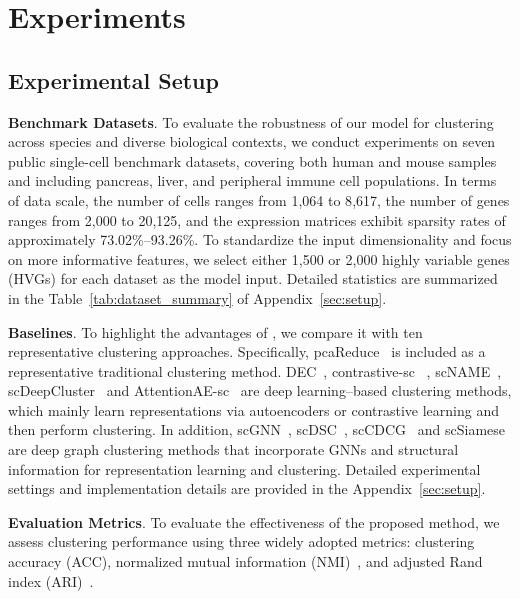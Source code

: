 \section{Experiments}
\label{sec::experiment}



\subsection{Experimental Setup}


\smallskip\noindent\textbf{Benchmark Datasets}. To evaluate the robustness of our model for clustering across species and diverse biological contexts, we conduct experiments on seven public single-cell benchmark datasets, covering both human and mouse samples and including pancreas, liver, and peripheral immune cell populations. 
In terms of data scale, the number of cells ranges from 1{,}064 to 8{,}617, the number of genes ranges from 2{,}000 to 20{,}125, and the expression matrices exhibit sparsity rates of approximately 73.02\%--93.26\%. To standardize the input dimensionality and focus on more informative features, we select either 1{,}500 or 2{,}000 highly variable genes (HVGs) for each dataset as the model input. Detailed statistics are summarized in the Table~\ref{tab:dataset_summary} of Appendix~\ref{sec:setup}.

\smallskip\noindent\textbf{Baselines}. To highlight the advantages of \method{}, we compare it with ten representative clustering approaches. Specifically, pcaReduce~\cite{vzurauskiene2016pcareduce} is included as a representative traditional clustering method. DEC~\cite{xie-et-al:dec}, contrastive-sc ~\cite{ciortan2021contrastive}, scNAME~\cite{wan-et-al:scname}, scDeepCluster~\cite{tian-et-al:model-based-scrnaseq} and AttentionAE-sc~\cite{li-et-al:attention-scrnaseq} are deep learning--based clustering methods, which mainly learn representations via autoencoders or contrastive learning and then perform clustering. In addition, scGNN~\cite{wang2021scgnn}, scDSC~\cite{gan2022deep},  scCDCG~\cite{xu2024sccdcg} and scSiamese~\cite{xu2025scsiameseclu} are deep graph clustering methods that incorporate GNNs and structural information for representation learning and clustering. Detailed experimental settings and implementation details are provided in the Appendix~\ref{sec:setup}.

\smallskip\noindent\textbf{Evaluation Metrics}. To evaluate the effectiveness of the proposed method, we assess clustering performance using three widely adopted metrics: clustering accuracy (ACC), normalized mutual information (NMI)~\cite{strehl-ghosh:cluster-ensembles}, and adjusted Rand index (ARI)~\cite{vinh-et-al:ari}.

